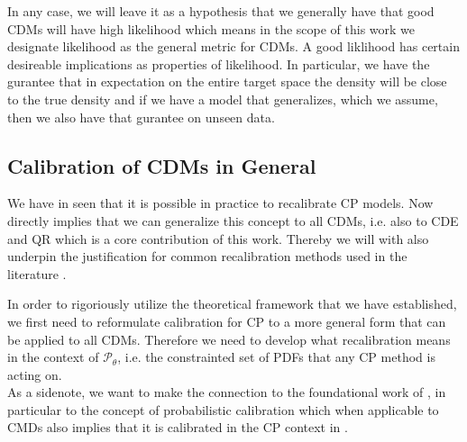 In any case, we will leave it as a hypothesis that we generally have that good CDMs will have high likelihood which means in the scope of this work we designate likelihood as the general metric for CDMs. A good liklihood has certain desireable implications as properties of likelihood. In particular, we have the gurantee that in expectation on the entire target space the density will be close to the true density and if we have a model that generalizes, which we assume, then we also have that gurantee on unseen data.%

\subsection{Calibration of CDMs in General}\label{sec:calibration_cde_general}

We have in  seen that it is possible in practice to recalibrate CP models. Now  directly implies that we can generalize this concept to all CDMs, i.e. also to CDE and QR which is a core contribution of this work. Thereby we will with  also underpin the justification for common recalibration methods used in the literature \cite{sesia2021conformal}.

In order to rigoriously utilize the theoretical framework that we have established, we first need to reformulate calibration for CP to a more general form that can be applied to all CDMs. Therefore we need to develop what recalibration means in the context of $\mathscr{P}_{\theta}$, i.e. the constrainted set of PDFs that any CP method is acting on.\\
As a sidenote, we want to make the connection to the foundational work of \cite{gneiting2007probabilistic}, in particular to the concept of probabilistic calibration which when applicable to CMDs also implies that it is calibrated in the CP context in .


